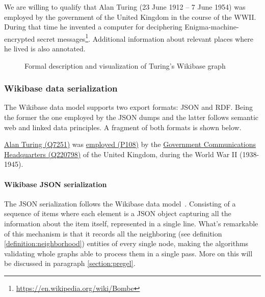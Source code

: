 \begin{example}
    \label{example:knowledgeGraph}
    We are willing to qualify that Alan Turing (23 June 1912 -- 7 June 1954) was employed by the government of the United Kingdom in the course of the WWII. During that time he invented a computer for deciphering Enigma-machine-encrypted secret messages\footnote{\url{https://en.wikipedia.org/wiki/Bombe}}. Additional information about relevant places where he lived is also annotated.
\end{example}



\begin{figure}[H]
    \centering
    
    \caption[Formal description and visualization of Turing's Wikibase graph]{Formal description and visualization of Turing's Wikibase graph}
\end{figure}

\subsubsection{Wikibase data serialization}
\label{section:wikibase:serialization}

The Wikibase data model supports two export formats: JSON and RDF. Being the former the one employed by the JSON dumps and the latter follows semantic web and linked data principles. A fragment of both formats is shown below.

\begin{example}
    \href{https://www.wikidata.org/wiki/Q7251}{Alan Turing (Q7251)} was \href{https://www.wikidata.org/wiki/Property:P108}{employed (P108)} by the \href{https://www.wikidata.org/wiki/Q220798}{Government Communications Headquarters (Q220798)} of the United Kingdom, during the World War II (1938-1945).
\end{example}

\paragraph{Wikibase JSON serialization}

The JSON serialization follows the Wikibase data model~\cite{https://doi.org/10.48550/arxiv.2110.11709}. Consisting of a sequence of items where each element is a JSON object capturing all the information about the item itself, represented in a single line. What's remarkable of this mechanism is that it records all the neighboring (see definition \ref{definition:neighborhood}) entities of every single node, making the algorithms validating whole graphs able to process them in a single pass. More on this will be discussed in paragraph \ref{section:pregel}.

